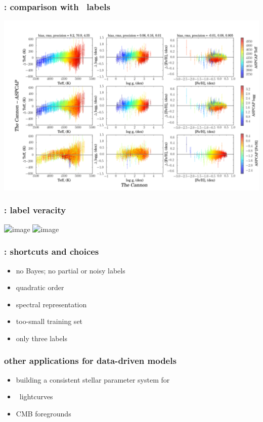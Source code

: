 \documentclass[pdftex]{beamer}
\begin{document}
\begin{frame}
  \frametitle{\tc: comparison with \apogee\ labels}
  \includegraphics[height=\figureheight]{../documents/plots/cplot2.png} 
\end{frame}

\begin{frame}
  \frametitle{\tc: label veracity}
  \includegraphics<1>[height=\figureheight]{../documents/plots/iso2_2.png}
  \includegraphics<2>[height=\figureheight]{../documents/plots/iso2a_2.png}
\end{frame}

\results

\begin{frame}
  \frametitle{\tc: shortcuts and choices}
  \begin{itemize}
  \item no Bayes; no partial or noisy labels
  \item quadratic order
  \item spectral representation
  \item too-small training set
  \item only three labels
  \end{itemize}
\end{frame}

\begin{frame}
  \frametitle{other applications for data-driven models}
  \begin{itemize}
  \item building a consistent stellar parameter system for \gaia
  \item \kepler\ lightcurves
  \item CMB foregrounds
  \end{itemize}
\end{frame}
\end{document}
